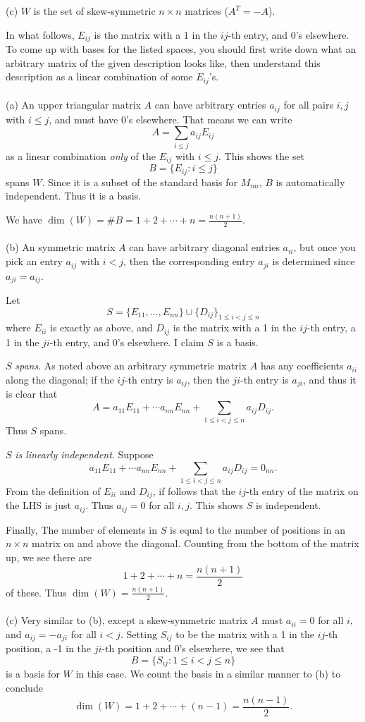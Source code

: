 (c) $W$ is the set of skew-symmetric $n\times n$ matrices ($A^T=-A$). 
\\
\begin{solution}
\noindent
In what follows, $E_{ij}$ is the matrix with a 1 in the $ij$-th entry, and 0's elsewhere. To come up with bases for the listed spaces, you should first write down what an arbitrary matrix of the given description looks like, then understand this description as a linear combination of some $E_{ij}$'s. 
\\ \\
(a) An upper triangular matrix $A$ can have arbitrary entries $a_{ij}$ for all pairs $i,j$ with $i\leq j$, and must have 0's elsewhere. That means we can write 
\[
A=\sum_{i\leq j}a_{ij}E_{ij}
\]
as a linear combination {\em only} of the $E_{ij}$ with $i\leq j$. This shows the set 
\[
B=\{E_{ij}\colon i\leq j\}
\]
spans $W$. Since it is a subset of the standard basis for $M_{nn}$, $B$ is automatically independent. Thus it is a basis. 

We have $\dim(W)=\#B=1+2+\cdots + n=\frac{n(n+1)}{2}$.
\\ \\
(b)  An symmetric matrix $A$ can have arbitrary diagonal entries $a_{ii}$, but once you pick an entry $a_{ij}$ with $i<j$, then the corresponding entry $a_{ji}$ is determined since $a_{ji}=a_{ij}$. 

Let
\[
S=\{E_{11},\dots ,E_{nn}\}\cup\{D_{ij}\}_{1\leq i<j\leq n}
\]
where $E_{ii}$ is exactly as above, and $D_{ij}$ is the matrix with a 1 in the $ij$-th entry, a 1 in the $ji$-th entry, and 0's elsewhere. I claim $S$ is a basis. 

$S$ {\em spans}. As noted above an arbitrary symmetric matrix $A$ has any coefficients $a_{ii}$ along the diagonal; if the $ij$-th entry is $a_{ij}$, then the $ji$-th entry is $a_{ji}$, and thus it is clear that 
\[
A=a_{11}E_{11}+\cdots a_{nn}E_{nn}+\sum_{1\leq i<j\leq n}a_{ij}D_{ij}.
\]
Thus $S$ spans. 

$S$ {\em is linearly independent}. Suppose 
\[
a_{11}E_{11}+\cdots a_{nn}E_{nn}+\sum_{1\leq i<j\leq n}a_{ij}D_{ij}=0_{nn}.
\]
From the definition of $E_{ii}$ and $D_{ij}$, if follows that the $ij$-th entry of the matrix on the LHS is just $a_{ij}$. Thus $a_{ij}=0$ for all $i,j$. This shows $S$ is independent. 

Finally, The number of elements in $S$ is equal to the number of positions in an $n\times n$ matrix on and above the diagonal. Counting from the bottom of the matrix up, we see there are 
\[
1+2+\cdots +n=\frac{n(n+1)}{2}
\]
of these. Thus $\dim(W)=\frac{n(n+1)}{2}$. 
\\ \\
(c) Very similar to (b), except a skew-symmetric matrix $A$ must $a_{ii}=0$ for all $i$, and $a_{ij}=-a_{ji}$ for all $i<j$. Setting $S_{ij}$ to be the matrix with a 1 in the $ij$-th position, a -1 in the $ji$-th position and 0's elsewhere, we see that 
\[
B=\{S_{ij}\colon 1\leq i<j\leq n\}
\]
is a basis for $W$ in this case. We count the basis in a similar manner to (b) to conclude 
\[
\dim(W)=1+2+\cdots +(n-1)=\frac{n(n-1)}{2}.
\]
\end{solution}

